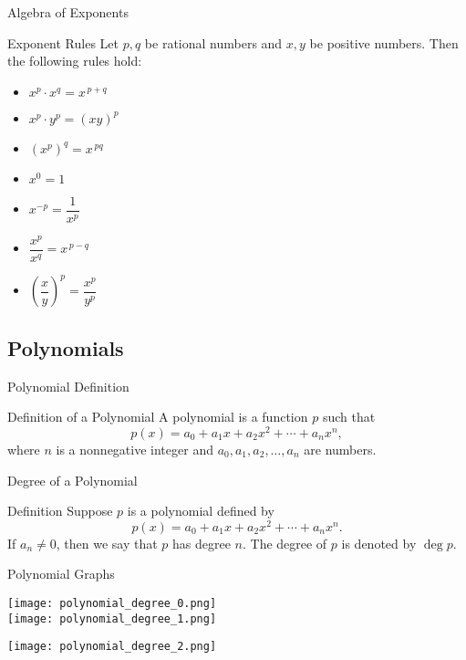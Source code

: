 \begin{frame}{Algebra of Exponents}
  \begin{block}{Exponent Rules}
    Let \(p, q\) be rational numbers and \(x, y\) be positive numbers. Then the following rules hold:
    \begin{itemize}
      \item \(x^p \cdot x^q = x^{\,p+q}\)
      \item \(x^p \cdot y^p = (xy)^p\)
      \item \((x^p)^q = x^{\,pq}\)
      \item \(x^0 = 1\)
      \item \(x^{-p} = \dfrac{1}{x^p}\)
      \item \(\dfrac{x^p}{x^q} = x^{\,p-q}\)
      \item \(\left(\dfrac{x}{y}\right)^p = \dfrac{x^p}{y^p}\)
    \end{itemize}
  \end{block}
\end{frame}
\subsection{Polynomials}
\begin{frame}{Polynomial Definition}
  \begin{block}{Definition of a Polynomial}
    A polynomial is a function \( p \) such that
    \[
      p(x) = a_0 + a_1 x + a_2 x^2 + \cdots + a_n x^n,
    \]
    where \( n \) is a nonnegative integer and \( a_0, a_1, a_2, \dots, a_n \) are numbers.
  \end{block}
\end{frame}

\begin{frame}{Degree of a Polynomial}
  \begin{block}{Definition}
    Suppose \( p \) is a polynomial defined by
    \[
      p(x) = a_0 + a_1 x + a_2 x^2 + \cdots + a_n x^n.
    \]
    If \( a_n \neq 0 \), then we say that \( p \) has degree \( n \). The degree of \( p \) is denoted by \(\deg p\).
  \end{block}
\end{frame}


\begin{frame}{Polynomial Graphs}
  \centering
  \begin{minipage}[t]{0.45\textwidth}
    \centering
    \texttt{[image: polynomial\_degree\_0.png]}\\[1mm]
    \texttt{[image: polynomial\_degree\_1.png]}\\[1mm]
  \end{minipage}
  \begin{minipage}[t]{0.45\textwidth}
    \centering
    \texttt{[image: polynomial\_degree\_2.png]}
  \end{minipage}
\end{frame}


